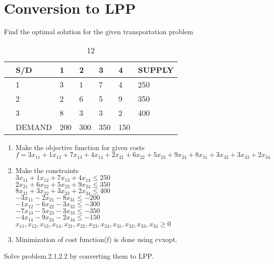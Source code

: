 \documentclass[journal,12pt,twocolumn]{IEEEtran}
\begin{document}
\section{Conversion to LPP}
\begin{problem} 
Find the optimal solution for the given transportation problem
\begin{table}[!h]
\begin{center}
\begin{tabular}{l  l | l l l l | l  }
                 
                 & S/D & 1 & 2 & 3 & 4 &  SUPPLY  \\
\hline
& 1 & 3 & 1 & 7 & 4 & 250 \\ 
& 2 & 2 & 6 & 5 & 9 & 350  \\ 
& 3 & 8 & 3 & 3 & 2 & 400 \\ 
\hline
&DEMAND& 200&300&350&150\\ 
\end{tabular}
\end{center}
\caption{12}
\end{table}
\end{problem}
\solution
\begin{enumerate}[1.]
\item 
Make the objective function for given costs
\\

$
f=3x_{11}+1x_{12}+7x_{13}+4x_{14}+
2x_{21}+6x_{22}+5x_{23}+9x_{24}+
8x_{31}+3x_{32}+3x_{33}+2x_{34} 
$
\\
\item 
Make the constraints
\\
$
3x_{11}+1x_{12}+7x_{13}+4x_{14} \leq 250$ \\$
2x_{21}+6x_{22}+5x_{23}+9x_{24} \leq 350$ \\$
8x_{31}+3x_{32}+3x_{33}+2x_{34} \leq 400$ \\$
-3x_{11}-2x_{21}-8x_{31} \leq -200  $ \\$
-1x_{12}-6x_{22}-3x_{32} \leq -300 $ \\$
-7x_{13}-5x_{23}-3x_{33} \leq -350 $ \\$
-4x_{14}-9x_{24}-2x_{34} \leq -150 $ \\$
x_{11},x_{12},x_{13},x_{14},x_{21},x_{22},x_{23},x_{24},
x_{31},x_{32},x_{33},x_{34} \geq 0
$
\item
Minimization of cost function(f) is done using cvxopt.


\end{enumerate}
\begin{problem}
Solve problem.2.1,2.2 by converting them to LPP.
\end{problem}
\end{document}
